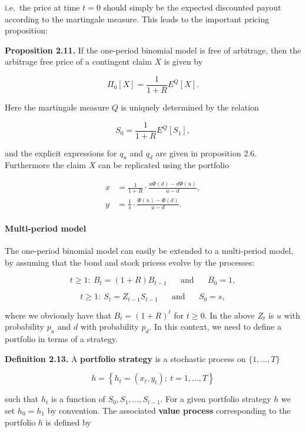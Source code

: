 \documentclass[
]{article}
\begin{document}
i.e.~the price at time \(t=0\) should simply be the expected discounted
payout according to the martingale measure. This leads to the important
pricing proposition:

\textbf{Proposition 2.11.} If the one-period binomial model is free of
arbitrage, then the arbitrage free price of a contingent claim \(X\) is
given by

\[
\Pi_0[X]=\frac{1}{1+R}E^Q[X].\tag{2.4}
\]

Here the martingale measure \(Q\) is uniquely determined by the relation

\[
S_0=\frac{1}{1+R}E^Q[S_1],\tag{2.5}
\]

and the explicit expressions for \(q_u\) and \(q_d\) are given in
proposition 2.6. Furthermore the claim \(X\) can be replicated using the
portfolio

\begin{align*}
x&=\frac{1}{1+R}\cdot\frac{u\Phi(d)-d\Phi(u)}{u-d},\tag{2.6}\\
y&=\frac{1}{s}\cdot\frac{\Phi(u)-\Phi(d)}{u-d}.\tag{2.7}
\end{align*}

\hypertarget{multi-period-model}{%
\paragraph{Multi-period model}\label{multi-period-model}}

The one-period binomial model can easily be extended to a multi-period
model, by assuming that the bond and stock pricess evolve by the
processes:

\[
t\ge1:\ B_t=(1+R)B_{t-1}\hspace{20pt}\text{and}\hspace{20pt}B_0=1,
\]

\[
t\ge1:\ S_t=Z_{t-1}S_{t-1}\hspace{20pt}\text{and}\hspace{20pt}S_0=s,
\]

where we obviously have that \(B_t=(1+R)^t\) for \(t\ge 0\). In the
above \(Z_t\) is \(u\) with probability \(p_u\) and \(d\) with
probability \(p_d\). In this context, we need to define a portfolio in
terms of a strategy.

\textbf{Definition 2.13.} A \textbf{portfolio strategy} is a stochastic
process on \(\{1,...,T\}\)

\[
h=\left\{h_t=(x_t,y_t);\ t=1,...,T\right\}
\]

such that \(h_t\) is a function of \(S_0,S_1,...,S_{t-1}\). For a given
portfolio strategy \(h\) we set \(h_0=h_1\) by convention. The
associated \textbf{value process} corresponding to the portfolio \(h\)
is defined by
\end{document}
